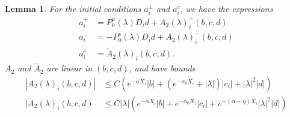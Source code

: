 \documentclass[10pt,reqno]{amsart}
\theoremstyle{plain}
\newtheorem{lemma}[theorem]{Lemma}
\theoremstyle{definition}
\theoremstyle{remark}
\numberwithin{theorem}{section}
\numberwithin{equation}{section}
\begin{document}
\begin{lemma}\label{lemma:aipm}
For the initial conditions $a_i^\pm$ and $a_i^c$, we have the expressions
\begin{equation}\label{aipmexp1}
\begin{aligned}
a_i^+ &= P_0^u(\lambda) D_i d + A_2(\lambda)_i^+(b, c, d) \\
a_i^- &= -P_0^s(\lambda) D_i d + A_2(\lambda)_i^-(b, c, d) \\
a_i^c &= \tilde{A}_2(\lambda)_i(b, c, d).
\end{aligned}
\end{equation}
$A_2$ and $\tilde{A}_2$ are linear in $(b, c, d)$, and have bounds
\begin{align}
|A_2(\lambda)_i(b, c, d)|
&\leq C \left(e^{-\alpha X_i}|b| + (e^{-\alpha_0 X_i} + |\lambda|)|c_i| + |\lambda|^2|d| \right) \label{A2bound} \\
|\tilde{A}_2(\lambda)_i(b, c, d) &\leq C |\lambda| \left( e^{-\alpha X_i} |b| + e^{-\alpha_0 X_i} |c_i| + e^{-(\alpha - \eta)X_i} |\lambda|^2 |d| \right) \label{tildeA2bound}
\end{align}


\end{lemma}
\end{document}
